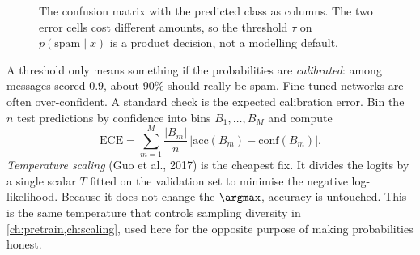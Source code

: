 \begin{figure}[ht]
\centering
{}
\caption{The confusion matrix with the predicted class as columns. The two error cells
cost different amounts, so the threshold $\tau$ on $p(\text{spam}\mid x)$ is a product
decision, not a modelling default.}
\label{fig:classify:confusion}
\end{figure}

A threshold only means something if the probabilities are \emph{calibrated}: among
messages scored $0.9$, about 90\% should really be spam. Fine-tuned networks are often
over-confident. A standard check is the expected calibration error. Bin the $n$ test
predictions by confidence into bins $B_1,\dots,B_M$ and compute
\begin{equation}
\mathrm{ECE} = \sum_{m=1}^{M}\frac{|B_m|}{n}\,\bigl|\mathrm{acc}(B_m)-\mathrm{conf}(B_m)\bigr|.
\end{equation}
\emph{Temperature scaling} (Guo et al., 2017) is the cheapest fix. It divides the logits
by a single scalar $T$ fitted on the validation set to minimise the negative
log-likelihood. Because it does not change the $\argmax$, accuracy is untouched. This is
the same temperature that controls sampling diversity in \cref{ch:pretrain,ch:scaling},
used here for the opposite purpose of making probabilities honest.

